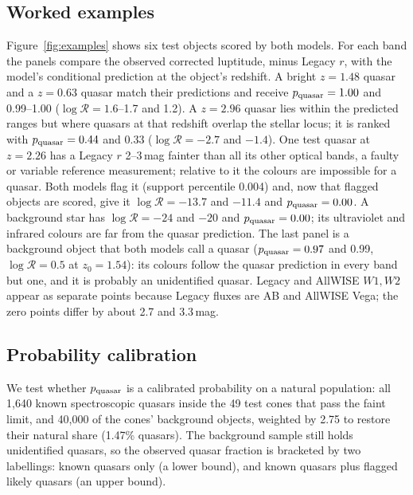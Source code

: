\documentclass[11pt,a4paper]{article}
\newcommand{\R}{\mathcal{R}}
\begin{document}
\subsection{Worked examples}
Figure~\ref{fig:examples} shows six test objects scored by both models. For each band the
panels compare the observed corrected luptitude, minus Legacy $r$, with the model's conditional prediction
at the object's redshift. A bright $z=1.48$ quasar and a $z=0.63$ quasar match their predictions and receive
$p_{\rm quasar}=1.00$ and 0.99--1.00 ($\log\R=1.6$--1.7 and 1.2). A $z=2.96$ quasar lies within the predicted ranges
but where quasars at that redshift overlap the stellar locus; it is ranked with $p_{\rm quasar}=0.44$ and 0.33
($\log\R=-2.7$ and $-1.4$). One test quasar at
$z=2.26$ has a Legacy $r$ 2--3\,mag fainter than all its other optical bands, a faulty or variable reference
measurement; relative to it the colours are impossible for a quasar. Both models flag it (support percentile
0.004) and, now that flagged objects are scored, give it $\log\R=-13.7$ and $-11.4$ and $p_{\rm quasar}=0.00$. A background star has $\log\R=-24$ and $-20$ and $p_{\rm quasar}=0.00$; its
ultraviolet and infrared colours are far from the quasar prediction. The last panel is a background object that
both models call a quasar ($p_{\rm quasar}=0.97$ and 0.99, $\log\R=0.5$ at $z_0=1.54$): its colours follow the quasar
prediction in every band but one, and it is probably an unidentified quasar. Legacy and AllWISE $W1,W2$
appear as separate points because Legacy fluxes are AB and AllWISE Vega; the zero points differ by
about 2.7 and 3.3\,mag.

\subsection{Probability calibration}\label{sec:calib}
We test whether $p_{\rm quasar}$ is a calibrated probability on a natural population: all 1,640 known
spectroscopic quasars inside the 49 test cones that pass the faint limit, and 40,000 of the cones'
background objects, weighted by 2.75 to restore their natural share (1.47\% quasars). The background
sample still holds unidentified quasars, so the observed quasar fraction is bracketed by two labellings:
known quasars only (a lower bound), and known quasars plus flagged likely quasars (an upper bound).
\end{document}
